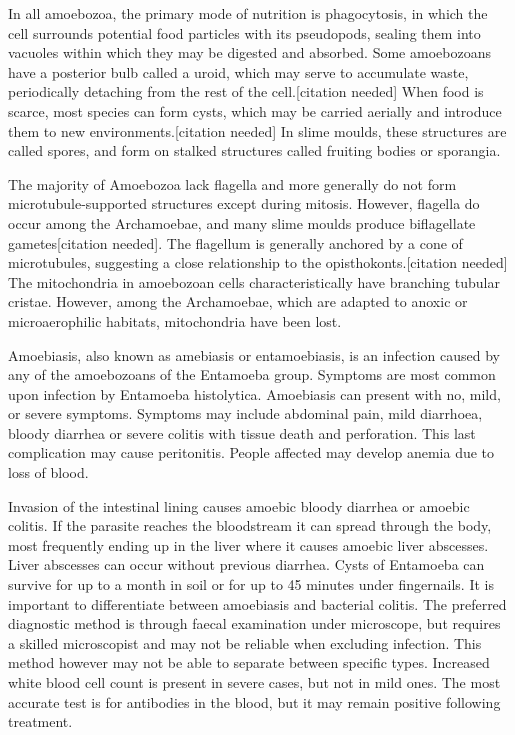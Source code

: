 In all amoebozoa, the primary mode of nutrition is phagocytosis, in which the cell surrounds potential food particles with its pseudopods, sealing them into vacuoles within which they may be digested and absorbed. Some amoebozoans have a posterior bulb called a uroid, which may serve to accumulate waste, periodically detaching from the rest of the cell.{[}citation needed{]} When food is scarce, most species can form cysts, which may be carried aerially and introduce them to new environments.{[}citation needed{]} In slime moulds, these structures are called spores, and form on stalked structures called fruiting bodies or sporangia.

The majority of Amoebozoa lack flagella and more generally do not form microtubule-supported structures except during mitosis. However, flagella do occur among the Archamoebae, and many slime moulds produce biflagellate gametes{[}citation needed{]}. The flagellum is generally anchored by a cone of microtubules, suggesting a close relationship to the opisthokonts.{[}citation needed{]} The mitochondria in amoebozoan cells characteristically have branching tubular cristae. However, among the Archamoebae, which are adapted to anoxic or microaerophilic habitats, mitochondria have been lost.

Amoebiasis, also known as amebiasis or entamoebiasis, is an infection caused by any of the amoebozoans of the Entamoeba group. Symptoms are most common upon infection by Entamoeba histolytica. Amoebiasis can present with no, mild, or severe symptoms. Symptoms may include abdominal pain, mild diarrhoea, bloody diarrhea or severe colitis with tissue death and perforation. This last complication may cause peritonitis. People affected may develop anemia due to loss of blood.

Invasion of the intestinal lining causes amoebic bloody diarrhea or amoebic colitis. If the parasite reaches the bloodstream it can spread through the body, most frequently ending up in the liver where it causes amoebic liver abscesses. Liver abscesses can occur without previous diarrhea. Cysts of Entamoeba can survive for up to a month in soil or for up to 45 minutes under fingernails. It is important to differentiate between amoebiasis and bacterial colitis. The preferred diagnostic method is through faecal examination under microscope, but requires a skilled microscopist and may not be reliable when excluding infection. This method however may not be able to separate between specific types. Increased white blood cell count is present in severe cases, but not in mild ones. The most accurate test is for antibodies in the blood, but it may remain positive following treatment.

